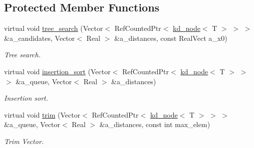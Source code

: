 \subsection*{Protected Member Functions}
\begin{DoxyCompactItemize}
\item 
virtual void \hyperlink{classkd__tree_a617e9406e70bed7741e9d62ad3711ef8}{tree\+\_\+search} (Vector$<$ Ref\+Counted\+Ptr$<$ \hyperlink{classkd__node}{kd\+\_\+node}$<$ T $>$ $>$ $>$ \&a\+\_\+candidates, Vector$<$ Real $>$ \&a\+\_\+distances, const Real\+Vect a\+\_\+x0)
\begin{DoxyCompactList}\small\item\em Tree search. \end{DoxyCompactList}\item 
virtual void \hyperlink{classkd__tree_a28e0be57e6dba76caeb1c949648d65ab}{insertion\+\_\+sort} (Vector$<$ Ref\+Counted\+Ptr$<$ \hyperlink{classkd__node}{kd\+\_\+node}$<$ T $>$ $>$ $>$ \&a\+\_\+queue, Vector$<$ Real $>$ \&a\+\_\+distances)
\begin{DoxyCompactList}\small\item\em Insertion sort. \end{DoxyCompactList}\item 
virtual void \hyperlink{classkd__tree_afe9722d1876a1a9707cffa5a382e52f7}{trim} (Vector$<$ Ref\+Counted\+Ptr$<$ \hyperlink{classkd__node}{kd\+\_\+node}$<$ T $>$ $>$ $>$ \&a\+\_\+queue, Vector$<$ Real $>$ \&a\+\_\+distances, const int max\+\_\+elem)
\begin{DoxyCompactList}\small\item\em Trim Vector. \end{DoxyCompactList}\end{DoxyCompactItemize}
